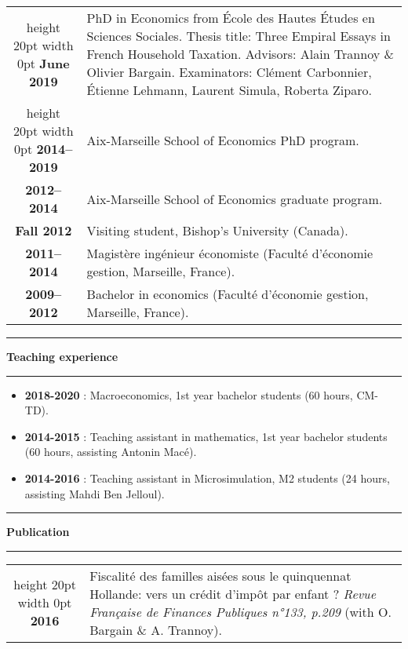 \documentclass[a4paper,11pt]{article} %
\newcommand\espace{\vrule height 20pt width 0pt}
\newcommand{\titre}[1]{%
	\begin{center}
	\rule{\textwidth}{1pt}
	\par\vspace{0.1cm}
        \textbf{\large #1}
	\par\rule{\textwidth}{1pt}
	\end{center}
	}
\begin{document}
\begin{tabular}{c@{:  }p{}}

\espace
\textbf{June 2019 } & PhD in Economics from École des Hautes Études en Sciences Sociales.
 \newline
  \newline Thesis title: Three Empiral Essays in French Household Taxation. 
 \newline Advisors: Alain Trannoy \& Olivier Bargain. 
 \newline Examinators: Clément Carbonnier, Étienne Lehmann, Laurent Simula, Roberta Ziparo. \\


\espace
\textbf{2014--2019 } & Aix-Marseille School of Economics PhD program. \\

\textbf{2012--2014} & Aix-Marseille School of Economics graduate program.  \\

\textbf{Fall 2012} & Visiting student, Bishop's University (Canada). \\

\textbf{2011--2014} & Magistère ingénieur économiste  (Faculté d'économie gestion, Marseille, France). \\

\textbf{2009--2012} & Bachelor in economics (Faculté d'économie gestion, Marseille, France). \\


\end{tabular}
\newpage
\titre{Teaching experience}
\begin{itemize}
\item \textbf{2018-2020} : Macroeconomics, 1st year bachelor students (60 hours, CM-TD).
\item \textbf{2014-2015} : Teaching assistant in mathematics, 1st year bachelor students (60 hours, assisting Antonin Macé).
\item \textbf{2014-2016} : Teaching assistant in Microsimulation, M2 students (24 hours, assisting Mahdi Ben Jelloul).

\end{itemize}

\titre{Publication}

\begin{tabular}{c@{:  }p{}}
\espace
 \textbf{2016} & Fiscalité des familles aisées sous le quinquennat Hollande: vers un crédit d'impôt par enfant ?   \emph{Revue Française de Finances Publiques n°133, p.209} (with O. Bargain \& A. Trannoy).


\end{tabular}
\end{document}
